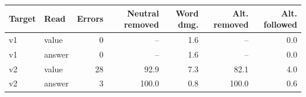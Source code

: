\begin{tabular}{@{}llrrrrr@{}}
\toprule
Target & Read & Errors & Neutral removed & Word dmg. & Alt. removed & Alt. followed \\
\midrule
v1 & value & 0 & -- & 1.6 & -- & 0.0 \\
v1 & answer & 0 & -- & 1.6 & -- & 0.0 \\
v2 & value & 28 & 92.9 & 7.3 & 82.1 & 4.0 \\
v2 & answer & 3 & 100.0 & 0.8 & 100.0 & 0.6 \\
\bottomrule
\end{tabular}
